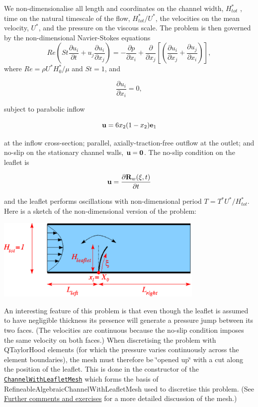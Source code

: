 We non-\/dimensionalise all length and coordinates on the channel width, $ H^*_{tot} $ , time on the natural timescale of the flow, $ H^*_{tot}/U^* $, the velocities on the mean velocity, $ U^* $, and the pressure on the viscous scale. The problem is then governed by the non-\/dimensional Navier-\/\+Stokes equations \[ Re \left( St \frac{\partial u_i}{\partial t} + u_j \frac{\partial u_i}{\partial x_j} \right) = - \frac{\partial p}{\partial x_i} + \frac{\partial }{\partial x_j} \left[ \left( \frac{\partial u_i}{\partial x_j} + \frac{\partial u_j}{\partial x_i} \right) \right], \] where $ Re = \rho U^* H_0^* / \mu $ and $ St = 1 $, and \begin{center} \[ \frac{\partial u_i}{\partial x_i} = 0, \] \end{center}  subject to parabolic inflow \begin{center} \[ {\bf u} = 6 x_2 (1-x_2) {\bf e}_1 \] \end{center}  at the inflow cross-\/section; parallel, axially-\/traction-\/free outflow at the outlet; and no-\/slip on the stationary channel walls, $ {\bf u} = {\bf 0} $. The no-\/slip condition on the leaflet is \begin{center} \[ {\bf u} = \frac{\partial {\bf R}_w(\xi,t)}{\partial t} \] \end{center}  and the leaflet performs oscillations with non-\/dimensional period $ T = T^* U^* / H^*_{tot} $. Here is a sketch of the non-\/dimensional version of the problem\+:

 
\begin{DoxyImage}
\includegraphics[width=0.75\textwidth]{channel_with_leaflet}
\end{DoxyImage}


An interesting feature of this problem is that even though the leaflet is assumed to have negligible thickness its presence will generate a pressure jump between its two faces. (The velocities are continuous because the no-\/slip condition imposes the same velocity on both faces.) When discretising the problem with {\ttfamily Q\+Taylor\+Hood} elements (for which the pressure varies continuously across the element boundaries), the mesh must therefore be \char`\"{}opened up\char`\"{} with a cut along the position of the leaflet. This is done in the constructor of the \href{../../../meshes/mesh_list/html/index.html#channel_with_leaflet}{\tt {\ttfamily Channel\+With\+Leaflet\+Mesh}} which forms the basis of {\ttfamily Refineable\+Algebraic\+Channel\+With\+Leaflet\+Mesh} used to discretise this problem. (See \hyperlink{index_comm_and_ex}{Further comments and exercises} for a more detailed discussion of the mesh.)




